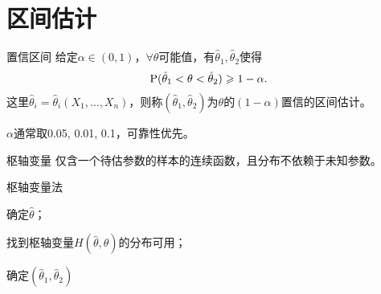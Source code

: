 \section{区间估计}
\begin{definition}{置信区间}{}
	给定$\alpha\in(0,1)$，$\forall\theta$可能值，有$\hat\theta_1,\hat\theta_2$使得
	\begin{equation}
		\P(\hat\theta_1<\theta<\hat\theta_2)\geqslant1-\alpha.
	\end{equation}
	这里$\hat\theta_i=\hat\theta_i(X_1,\ldots,X_n)$，则称$(\hat\theta_1,\hat\theta_2)$为$\theta$的$(1-\alpha)$置信的区间估计。
\end{definition}
$\alpha$通常取0.05, 0.01, 0.1，可靠性优先。
\begin{definition}{枢轴变量}{}
	仅含一个待估参数的样本的连续函数，且分布不依赖于未知参数。
\end{definition}
\begin{method}{枢轴变量法}{}
	\begin{compactenum}
		\item 确定$\hat\theta$；
		\item 找到枢轴变量$H(\hat\theta,\theta)$的分布可用；
		\item 确定$(\hat\theta_1,\hat\theta_2)$
	\end{compactenum}
\end{method}
